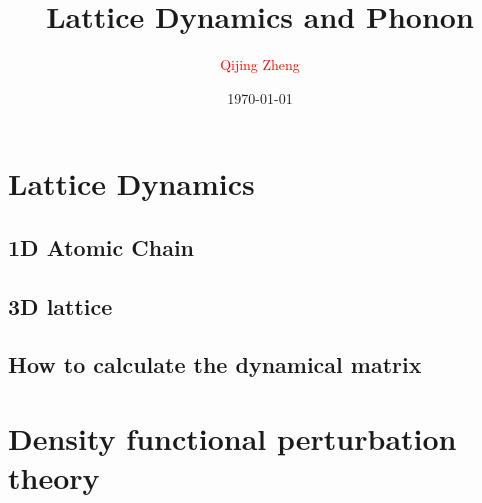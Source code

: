 \documentclass[8pt,dvipsnames]{beamer}
\title[]{
  Lattice Dynamics and Phonon
}
\author[Q.J. Zheng]{
  \textcolor{red}{Qijing Zheng} \\
}
\institute[D.P. USTC]{
  Department of Physics \\
  \medskip
  University of Science and Technology of China \\
  \smallskip
  \texttt{[image: logo.jpg]}
}
\date{\today}
\begin{document}

% 

\section{Lattice Dynamics}

\subsection{1D Atomic Chain}








\subsection{3D lattice}







\subsection{How to calculate the dynamical matrix}






\section{Density functional perturbation theory}







\end{document}
